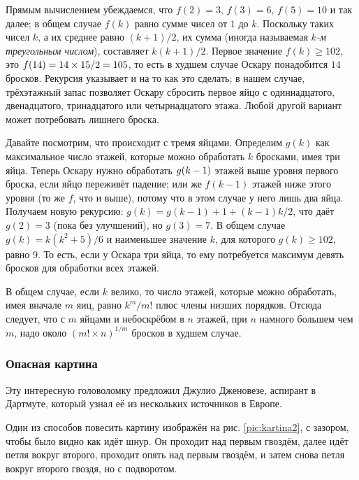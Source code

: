 Прямым вычислением убеждаемся, что $f(2) = 3$, $f(3) = 6$, $f(5) = 10$ и так далее; в общем случае $f(k)$ равно сумме чисел от $1$ до $k$.
Поскольку таких чисел $k$, а их среднее равно $(k + 1)/2$, их сумма (иногда называемая \emph{$k$-м треугольным числом}), составляет $k(k + 1)/2$.
Первое значение $f(k)\ge 102$, это $f(14) \z= 14 \times 15/2 \z= 105$, то есть в худшем случае Оскару понадобится $14$ бросков.
Рекурсия указывает и на то как это сделать;
в нашем случае, трёхэтажный запас позволяет Оскару сбросить первое яйцо с одиннадцатого, двенадцатого, тринадцатого или четырнадцатого этажа.
Любой другой вариант может потребовать лишнего броска.

Давайте посмотрим, что происходит с тремя яйцами.
Определим $g(k)$ как максимальное число этажей, которые можно обработать $k$ бросками, имея три яйца.
Теперь Оскару нужно обработать $g(k \z- 1)$ этажей выше уровня первого броска, если яйцо переживёт падение;
или же $f(k - 1)$ этажей ниже этого уровня (то же $f$, что и выше), потому что в этом случае у него лишь два яйца.
Получаем новую рекурсию: $g(k) = g(k-1) + 1 + (k - 1)k/2$, что даёт $g(2) = 3$ (пока без улучшений), но $g(3) = 7$.
В общем случае $g(k)=k(k^2+5)/6$ и наименьшее значение $k$, для которого 
$g(k)\ge 102$, равно $9$.
То есть, если у Оскара три яйца,
то ему потребуется максимум девять бросков для обработки всех этажей.

В общем случае, если $k$ велико, то число этажей, которые можно обработать, имея вначале $m$ яиц, равно $k^m/m!$ плюс члены низших порядков.
Отсюда следует, что с $m$ яйцами и небоскрёбом в $n$ этажей, при $n$ намного большем чем $m$, надо около $(m!\times n)^{1/m}$ бросков в худшем случае.

\subsubsection*{Опасная картина}

Эту интересную головоломку предложил Джулио Дженовезе, аспирант в Дартмуте, который узнал её из нескольких источников в Европе.

Один из способов повесить картину изображён на рис. \ref{pic:kartina2}, с зазором, чтобы было видно как идёт шнур.
Он проходит над первым гвоздём,
далее идёт петля вокруг второго,
проходит опять над первым гвоздём, и затем снова петля вокруг второго гвоздя, но с подворотом.

